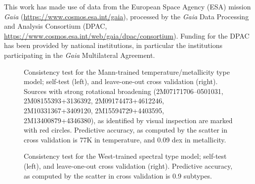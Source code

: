 \documentclass[modern]{aastex62}
\begin{document}
This work has made use of data from the European Space Agency (ESA) mission
{\it Gaia} (\url{https://www.cosmos.esa.int/gaia}), processed by the {\it Gaia}
Data Processing and Analysis Consortium (DPAC,
\url{https://www.cosmos.esa.int/web/gaia/dpac/consortium}). Funding for the DPAC
has been provided by national institutions, in particular the institutions
participating in the {\it Gaia} Multilateral Agreement.

\color{gcolor}{HOGG: grants etc}\color{black} 

\color{gcolor}{ADAM: grants etc, FAST acknowledgement?}\color{black}


\newpage

\begin{figure}[ht]
\caption{Consistency test for the Mann-trained temperature/metallicity type model; self-test (left), and leave-one-out cross validation (right). Sources with strong rotational broadening (2M07171706--0501031, 2M08155393+3136392, 2M09174473+4612246, 2M10331367+3409120, 2M15594729+4403595, 2M13400879+4346380), as identified by visual inspection are marked with red circles. Predictive accuracy, as computed by the scatter in cross validation is 77K in temperature, and 0.09 dex in metallicity.}\label{fig:mann_validation}
\end{figure}

\begin{figure}[ht]
\begin{center}
\end{center}
\caption{Consistency test for the West-trained spectral type model; self-test (left), and leave-one-out cross validation (right).  Predictive accuracy, as computed by the scatter in cross validation is 0.9 subtypes.}\label{fig:west_validation}
\end{figure}
\end{document}
